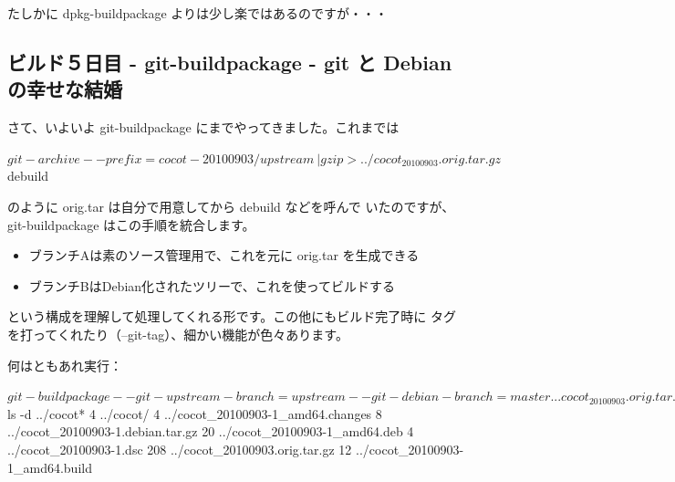 \documentclass[mingoth,a4paper]{jsarticle}
\begin{document}

たしかに dpkg-buildpackage よりは少し楽ではあるのですが・・・

\subsection{ビルド５日目 - git-buildpackage - git と Debian の幸せな結婚}

さて、いよいよ git-buildpackage にまでやってきました。これまでは

\begin{commandline}
$ git-archive --prefix=cocot-20100903/ upstream \
| gzip > ../cocot_20100903.orig.tar.gz
$ debuild
\end{commandline}

のように orig.tar は自分で用意してから debuild などを呼んで
いたのですが、git-buildpackage はこの手順を統合します。

\begin{itemize}
\item ブランチAは素のソース管理用で、これを元に orig.tar を生成できる
\item ブランチBはDebian化されたツリーで、これを使ってビルドする
\end{itemize}

という構成を理解して処理してくれる形です。この他にもビルド完了時に
タグを打ってくれたり（--git-tag）、細かい機能が色々あります。

何はともあれ実行：

\begin{commandline}
$ git-buildpackage --git-upstream-branch=upstream --git-debian-branch=master
...
cocot_20100903.orig.tar.gz does not exist, creating from 'upstream'
 dpkg-buildpackage -rfakeroot -D -us -uc -i -I
 ...
$ ls -d ../cocot*
  4 ../cocot/                            4 ../cocot_20100903-1_amd64.changes
  8 ../cocot_20100903-1.debian.tar.gz   20 ../cocot_20100903-1_amd64.deb
  4 ../cocot_20100903-1.dsc            208 ../cocot_20100903.orig.tar.gz
 12 ../cocot_20100903-1_amd64.build
\end{commandline}
\end{document}
